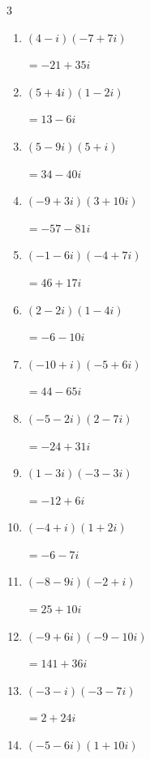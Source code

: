 \begin{multicols}{3}
\begin{enumerate}
  \item $\displaystyle (4-i)(-7+7i)$

        $\displaystyle =-21+35i$

  \item $\displaystyle (5+4i)(1-2i)$

        $\displaystyle =13-6i$

\columnbreak %

  \item $\displaystyle (5-9i)(5+i)$

        $\displaystyle =34-40i$

  \item $\displaystyle (-9+3i)(3+10i)$

        $\displaystyle =-57-81i$

  \item $\displaystyle (-1-6i)(-4+7i)$

        $\displaystyle =46+17i$

  \item $\displaystyle (2-2i)(1-4i)$

        $\displaystyle =-6-10i$

  \item $\displaystyle (-10+i)(-5+6i)$

        $\displaystyle =44-65i$

  \item $\displaystyle (-5-2i)(2-7i)$

        $\displaystyle =-24+31i$

  \item $\displaystyle (1-3i)(-3-3i)$

        $\displaystyle =-12+6i$

  \item $\displaystyle (-4+i)(1+2i)$

        $\displaystyle =-6-7i$

  \item $\displaystyle (-8-9i)(-2+i)$

        $\displaystyle =25+10i$

  \item $\displaystyle (-9+6i)(-9-10i)$

        $\displaystyle =141+36i$

  \item $\displaystyle (-3-i)(-3-7i)$

        $\displaystyle =2+24i$

  \item $\displaystyle (-5-6i)(1+10i)$


\end{enumerate}
\end{multicols}
